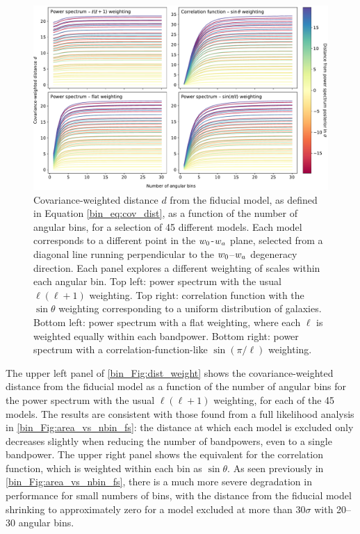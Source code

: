 \begin{figure}[tp]
\includegraphics[width=\textwidth]{dist_weight}
\caption{Covariance-weighted distance $d$ from the fiducial model, as defined in Equation \eqref{bin_eq:cov_dist}, as a function of the number of angular bins, for a selection of 45 different models. Each model corresponds to a different point in the $w_0$-$w_a$ plane, selected from a diagonal line running perpendicular to the $w_0$--$w_a$ degeneracy direction. Each panel explores a different weighting of scales within each angular bin. Top left: power spectrum with the usual $\ell \left( \ell + 1 \right)$ weighting. Top right: correlation function with the $\sin{\theta}$ weighting corresponding to a uniform distribution of galaxies. Bottom left: power spectrum with a flat weighting, where each $\ell$ is weighted equally within each bandpower. Bottom right: power spectrum with a correlation-function-like $\sin{\left( \pi / \ell \right)}$ weighting.}
\label{bin_Fig:dist_weight}
\end{figure}

The upper left panel of \autoref{bin_Fig:dist_weight} shows the covariance-weighted distance from the fiducial model as a function of the number of angular bins for the power spectrum with the usual $\ell \left( \ell + 1 \right)$ weighting, for each of the 45 models. The results are consistent with those found from a full likelihood analysis in \autoref{bin_Fig:area_vs_nbin_fs}: the distance at which each model is excluded only decreases slightly when reducing the number of bandpowers, even to a single bandpower. The upper right panel shows the equivalent for the correlation function, which is weighted within each bin as $\sin{\theta}$. As seen previously in \autoref{bin_Fig:area_vs_nbin_fs}, there is a much more severe degradation in performance for small numbers of bins, with the distance from the fiducial model shrinking to approximately zero for a model excluded at more than 30$\sigma$ with 20--30 angular bins.

